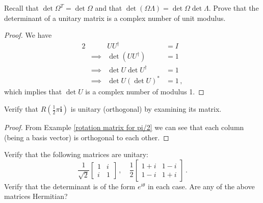 \begin{exercise}
Recall that $\det \Omega^T = \det \Omega$ and that $\det (\Omega\Lambda) = \det \Omega \det \Lambda$. Prove that the determinant of a unitary matrix is a complex number of unit modulus.
\end{exercise}

\begin{proof}
We have
\begin{alignat}{2}
    &&UU^\dagger &= I \\
    &\implies &\det (UU^\dagger) &= 1 \\
    &\implies &\det U \det U^\dagger &= 1 \\
    &\implies &\det U (\det U)^* &= 1\,,
\end{alignat}
which implies that $\det U$ is a complex number of modulus 1.
\end{proof}

\begin{exercise}
Verify that $R(\tfrac{1}{2}\pi \bm{i})$ is unitary (orthogonal) by examining its matrix.
\end{exercise}

\begin{proof}
From Example \eqref{rotation matrix for pi/2} we can see that each column (being a basis vector) is orthogonal to each other.
\end{proof}

\begin{exercise}
Verify that the following matrices are unitary:
\begin{equation}
    \frac{1}{\sqrt{2}}
    \begin{bmatrix}
    1 & i \\
    i & 1
    \end{bmatrix}\,,
    \quad \frac{1}{2}
    \begin{bmatrix}
    1 + i & 1 - i \\
    1 - i & 1 + i
    \end{bmatrix}\,.
\end{equation}
Verify that the determinant is of the form $e^{i\theta}$ in each case. Are any of the above matrices Hermitian?
\end{exercise}

